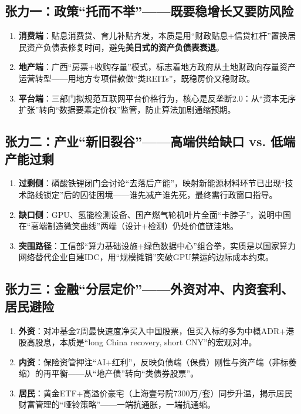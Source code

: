\subsection{张力一：政策“托而不举”——既要稳增长又要防风险}
\begin{enumerate}[leftmargin=*, nosep]
    \item \textbf{消费端}：贴息消费贷、育儿补贴齐发，本质是用“财政贴息+信贷杠杆”置换居民资产负债表修复时间，避免\textbf{美日式的资产负债表衰退}。
    \item \textbf{地产端}：广西“房票+收购存量”模式，标志着地方政府从土地财政向存量资产运营转型——用地方专项借款做“类REITs”，既稳房价又稳财政。
    \item \textbf{平台端}：三部门拟规范互联网平台价格行为，核心是反垄断2.0：从“资本无序扩张”转向“数据要素定价权”监管，防止算法加剧通缩预期。
\end{enumerate}

\subsection{张力二：产业“新旧裂谷”——高端供给缺口 vs. 低端产能过剩}
\begin{enumerate}[leftmargin=*, nosep]
    \item \textbf{过剩侧}：磷酸铁锂闭门会讨论“去落后产能”，映射新能源材料环节已出现“技术路线锁定”后的囚徒困境——谁先减产谁先死，最终需行政窗口指导。
    \item \textbf{缺口侧}：GPU、氢能检测设备、国产燃气轮机叶片全面“卡脖子”，说明中国在“高端制造微笑曲线”两端（设计+检测）仍处价值链洼地。
    \item \textbf{突围路径}：工信部“算力基础设施+绿色数据中心”组合拳，实质是以国家算力网络替代企业自建IDC，用“规模摊销”突破GPU禁运的边际成本约束。
\end{enumerate}

\subsection{张力三：金融“分层定价”——外资对冲、内资套利、居民避险}
\begin{enumerate}[leftmargin=*, nosep]
    \item \textbf{外资}：对冲基金7周最快速度净买入中国股票，但买入标的多为中概ADR+港股高股息，本质是“long China recovery, short CNY”的宏观对冲。
    \item \textbf{内资}：保险资管押注“AI+红利”，反映负债端（保费）刚性与资产端（非标萎缩）的再平衡——从“地产债”转向“类债券股票”。
    \item \textbf{居民}：黄金ETF+高溢价豪宅（上海壹号院7300万/套）同步升温，揭示居民财富管理的“哑铃策略”——一端抗通胀，一端抗通缩。
\end{enumerate}

